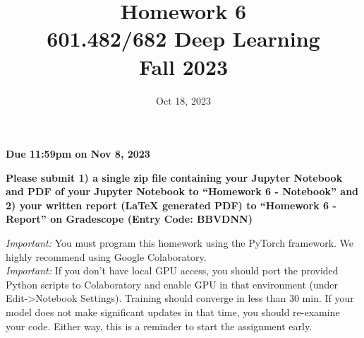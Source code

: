 \documentclass[a4paper]{article}
\title{Homework 6\\
	601.482/682 Deep Learning\\
	Fall 2023}
\date{Oct 18, 2023}
\begin{document}
	\maketitle

	\begin{center}
		\textbf{Due 11:59pm on Nov 8, 2023}
	\end{center}
	\begin{center}\textbf{Please submit 1) a single zip file containing your Jupyter Notebook and PDF of your Jupyter Notebook to ``Homework 6 - Notebook'' and 2) your written report (LaTeX generated PDF) to ``Homework 6 - Report'' on Gradescope (Entry Code: BBVDNN)}
	\end{center}

	\noindent \emph{Important:} You must program this homework using the PyTorch framework. We highly recommend using Google Colaboratory.\\

	\noindent \emph{Important:} If you don't have local GPU access, you should port the provided Python scripts to Colaboratory and enable GPU in that environment (under Edit->Notebook Settings). Training should converge in less than 30 min. If your model does not make significant updates in that time, you should re-examine your code. Either way, this is a reminder to start the assignment early.
\end{document}
